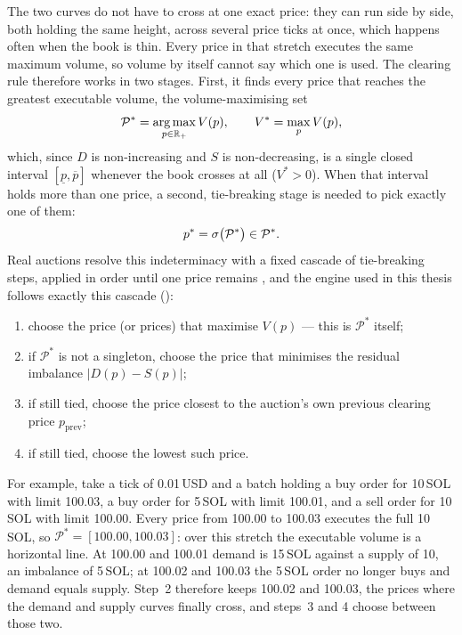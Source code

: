 The two curves do not have to cross at one exact price: they can run side
by side, both holding the same height, across several price ticks at
once, which happens often when the book is thin. Every price in that
stretch executes the same maximum volume, so volume by itself cannot say
which one is used. The clearing rule therefore works in two
stages. First, it finds every price that reaches the greatest executable
volume, the volume-maximising set
\begin{equation}
  \mathcal{P}^{*} = \operatorname*{arg\,max}_{p \in \mathbb{R}_{+}} V(p),
  \qquad V^{*} = \max_{p} V(p),
\end{equation}
which, since $D$ is non-increasing and $S$ is non-decreasing, is a single
closed interval $[\underline{p}, \overline{p}]$ whenever the book crosses
at all ($V^{*} > 0$). When that interval holds more than one price, a
second, tie-breaking stage is needed to pick exactly one of them:
\begin{equation}
  \label{eq:clearing}
  p^{\ast} = \sigma\bigl(\mathcal{P}^{*}\bigr) \in \mathcal{P}^{*}.
\end{equation}
Real auctions resolve this indeterminacy with a fixed cascade of
tie-breaking steps, applied in order until one price remains
\citep{haynes2020precedence}, and the engine used in this thesis follows
exactly this cascade ():
\begin{enumerate}
  \item choose the price (or prices) that maximise $V(p)$ --- this is
  $\mathcal{P}^{*}$ itself;
  \item if $\mathcal{P}^{*}$ is not a singleton, choose the price that
  minimises the residual imbalance $|D(p) - S(p)|$;
  \item if still tied, choose the price closest to the auction's own
  previous clearing price $p_{\mathrm{prev}}$;
  \item if still tied, choose the lowest such price.
\end{enumerate}
For example, take a tick of 0.01\,USD and a batch holding a buy order for
10\,SOL with limit 100.03, a buy order for 5\,SOL with limit 100.01, and a
sell order for 10\,SOL with limit 100.00. Every price from 100.00 to
100.03 executes the full 10\,SOL, so $\mathcal{P}^{*} = [100.00, 100.03]$:
over this stretch the executable volume is a horizontal line. At 100.00
and 100.01 demand is 15\,SOL against a supply of 10, an imbalance of
5\,SOL; at 100.02 and 100.03 the 5\,SOL order no longer buys and demand
equals supply. Step~2 therefore keeps 100.02 and 100.03, the prices where
the demand and supply curves finally cross, and steps~3 and 4 choose
between those two.

